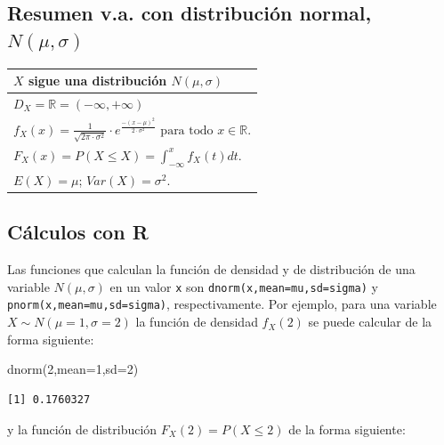 \documentclass[
  letterpaper,
  DIV=11,
  numbers=noendperiod]{scrreprt}
\newenvironment{Shaded}{\begin{snugshade}}{\end{snugshade}}
\newcommand{\AttributeTok}[1]{\textcolor[rgb]{0.40,0.45,0.13}{#1}}
\newcommand{\DecValTok}[1]{\textcolor[rgb]{0.68,0.00,0.00}{#1}}
\newcommand{\FunctionTok}[1]{\textcolor[rgb]{0.28,0.35,0.67}{#1}}
\newcommand{\NormalTok}[1]{\textcolor[rgb]{0.00,0.23,0.31}{#1}}
\begin{document}
\subsection{\texorpdfstring{Resumen v.a. con distribución normal,
\(N(\mu,\sigma)\)}{Resumen v.a. con distribución normal, N(\textbackslash mu,\textbackslash sigma)}}\label{resumen-v.a.-con-distribuciuxf3n-normal-nmusigma}

\renewcommand{\arraystretch}{2}
\begin{table}
\centering
\begin{tabular}{|l|}
\hline\rowcolor{LightBlue}
$X$ sigue una distribución $N(\mu,\sigma)$ \\\hline
$D_X=\mathbb{R}=(-\infty,+\infty)$\\\hline
$f_{X}(x)=\frac{1}{\sqrt{2\pi\cdot\sigma^2}}\cdot e^{\frac{-(x-\mu)^2}{2\cdot \sigma^2}}\mbox{ para todo }x\in \mathbb{R}.$\\\hline
$\displaystyle F_X(x)=P(X\leq X)=\int_{-\infty}^x f_X(t) dt.$\\\hline
$E(X)=\mu$; $Var(X)=\sigma^2.$
\\\hline
\end{tabular}
\end{table}

\subsection{Cálculos con R}\label{cuxe1lculos-con-r-4}

Las funciones que calculan la función de densidad y de distribución de
una variable \(N(\mu,\sigma)\) en un valor \texttt{x} son
\texttt{dnorm(x,mean=mu,sd=sigma)} y \texttt{pnorm(x,mean=mu,sd=sigma)},
respectivamente. Por ejemplo, para una variable
\(X\sim N(\mu=1,\sigma=2)\) la función de densidad \(f_X(2)\) se puede
calcular de la forma siguiente:

\begin{Shaded}
\begin{Highlighting}[]
\FunctionTok{dnorm}\NormalTok{(}\DecValTok{2}\NormalTok{,}\AttributeTok{mean=}\DecValTok{1}\NormalTok{,}\AttributeTok{sd=}\DecValTok{2}\NormalTok{)}
\end{Highlighting}
\end{Shaded}

\begin{verbatim}
[1] 0.1760327
\end{verbatim}

y la función de distribución \(F_X(2) = P(X\leq 2)\) de la forma
siguiente:
\end{document}
